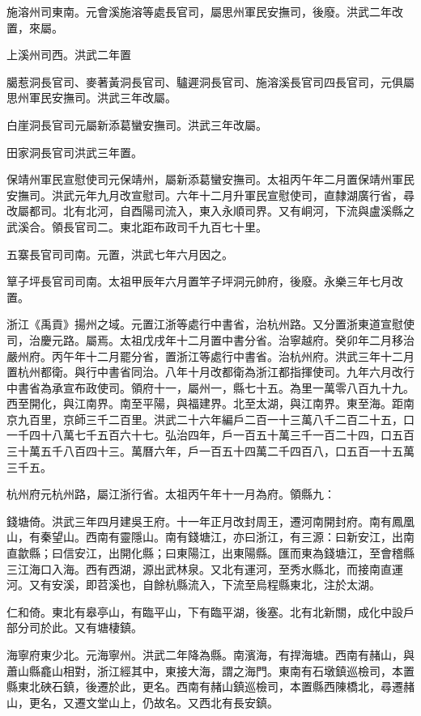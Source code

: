 施溶州司東南。元會溪施溶等處長官司，屬思州軍民安撫司，後廢。洪武二年改置，來屬。

上溪州司西。洪武二年置

臈惹洞長官司、麥著黃洞長官司、驢遲洞長官司、施溶溪長官司四長官司，元俱屬思州軍民安撫司。洪武三年改屬。

白崖洞長官司元屬新添葛蠻安撫司。洪武三年改屬。

田家洞長官司洪武三年置。

保靖州軍民宣慰使司元保靖州，屬新添葛蠻安撫司。太祖丙午年二月置保靖州軍民安撫司。洪武元年九月改宣慰司。六年十二月升軍民宣慰使司，直隸湖廣行省，尋改屬都司。北有北河，自酉陽司流入，東入永順司界。又有峒河，下流與盧溪縣之武溪合。領長官司二。東北距布政司千九百七十里。

五寨長官司司南。元置，洪武七年六月因之。

筸子坪長官司司南。太祖甲辰年六月置竿子坪洞元帥府，後廢。永樂三年七月改置。

浙江《禹貢》揚州之域。元置江浙等處行中書省，治杭州路。又分置浙東道宣慰使司，治慶元路。屬焉。太祖戊戌年十二月置中書分省。治寧越府。癸卯年二月移治嚴州府。丙午年十二月罷分省，置浙江等處行中書省。治杭州府。洪武三年十二月置杭州都衛。與行中書省同治。八年十月改都衛為浙江都指揮使司。九年六月改行中書省為承宣布政使司。領府十一，屬州一，縣七十五。為里一萬零八百九十九。西至開化，與江南界。南至平陽，與福建界。北至太湖，與江南界。東至海。距南京九百里，京師三千二百里。洪武二十六年編戶二百一十三萬八千二百二十五，口一千四十八萬七千五百六十七。弘治四年，戶一百五十萬三千一百二十四，口五百三十萬五千八百四十三。萬曆六年，戶一百五十四萬二千四百八，口五百一十五萬三千五。

杭州府元杭州路，屬江浙行省。太祖丙午年十一月為府。領縣九：

錢塘倚。洪武三年四月建吳王府。十一年正月改封周王，遷河南開封府。南有鳳凰山，有秦望山。西南有靈隱山。南有錢塘江，亦曰浙江，有三源：曰新安江，出南直歙縣；曰信安江，出開化縣；曰東陽江，出東陽縣。匯而東為錢塘江，至會稽縣三江海口入海。西有西湖，源出武林泉。又北有運河，至秀水縣北，而接南直運河。又有安溪，即苕溪也，自餘杭縣流入，下流至烏程縣東北，注於太湖。

仁和倚。東北有皋亭山，有臨平山，下有臨平湖，後塞。北有北新關，成化中設戶部分司於此。又有塘棲鎮。

海寧府東少北。元海寧州。洪武二年降為縣。南濱海，有捍海塘。西南有赭山，與蕭山縣龕山相對，浙江經其中，東接大海，謂之海門。東南有石墩鎮巡檢司，本置縣東北硤石鎮，後遷於此，更名。西南有赭山鎮巡檢司，本置縣西陳橋北，尋遷赭山，更名，又遷文堂山上，仍故名。又西北有長安鎮。

